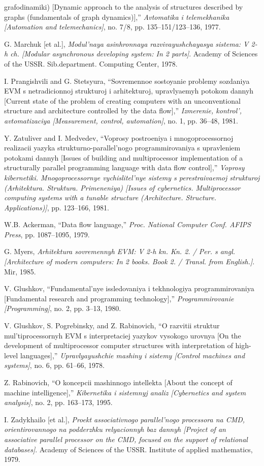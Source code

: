 \documentclass{article}
\begin{document}
{\begin{multicols}{2}
{\begin{enumerate}[label={[\arabic*]}]
grafodinamiki) [Dynamic approach to the analysis of structures
described by graphs (fundamentals of graph dynamics)],” \textit{Avtomatika i telemekhanika [Automation and telemechanics]}, no.
7/8, pp. 135–151/123–136, 1977.
    \item  G. Marchuk [et al.], \textit{Modul’naya asinhronnaya
razvivayushchayasya sistema: V 2-h ch. [Modular asynchronous
developing system: In 2 parts]}. Academy of Sciences of the
USSR. Sib.department. Computing Center, 1978.
    \item
    I. Prangishvili and G. Stetsyura, “Sovremennoe sostoyanie problemy sozdaniya EVM s netradicionnoj strukturoj i arhitekturoj,
upravlyaemyh potokom dannyh [Current state of the problem
of creating computers with an unconventional structure and
architecture controlled by the data flow],” \textit{Izmerenie, kontrol’,
avtomatizaciya [Measurement, control, automation]}, no. 1, pp.
36–48, 1981.
    \item Y. Zatuliver and I. Medvedev, “Voprosy postroeniya i mnogoprocessornoj realizacii yazyka strukturno-parallel’nogo programmirovaniya s upravleniem potokami dannyh [Issues of
building and multiprocessor implementation of a structurally
parallel programming language with data flow control],” \textit{Voprosy kibernetiki. Mnogoprocessornye vychislitel’nye sistemy s
perestraivaemoj strukturoj (Arhitektura. Struktura. Primeneniya)
[Issues of cybernetics. Multiprocessor computing systems with
a tunable structure (Architecture. Structure. Applications)]}, pp.
123–166, 1981.
    \item
    W.B. Ackerman, “Data flow language,” \textit{Proc. National Computer
Conf. AFIPS Press}, pp. 1087–1095, 1979.
    \item G. Myers, \textit{Arhitektura sovremennyh EVM: V 2-h kn. Kn. 2. / Per.
s angl. [Architecture of modern computers: In 2 books. Book 2. /
Transl. from English.]}. Mir, 1985.
    \item V. Glushkov, “Fundamental’nye issledovaniya i tekhnologiya
programmirovaniya [Fundamental research and programming
technology],” \textit{Programmirovanie [Programming]}, no. 2, pp. 3–13,
1980.
    \item V. Glushkov, S. Pogrebinsky, and Z. Rabinovich, “O razvitii struktur mul’tiprocessornyh EVM s interpretaciej yazykov
vysokogo urovnya [On the development of multiprocessor computer structures with interpretation of high-level languages],”
\textit{Upravlyayushchie mashiny i sistemy [Control machines and
systems]}, no. 6, pp. 61–66, 1978.
    \item Z. Rabinovich, “O koncepcii mashinnogo intellekta [About the
concept of machine intelligence],” \textit{Kibernetika i sistemnyj analiz
[Cybernetics and system analysis]}, no. 2, pp. 163–173, 1995.
    \item I. Zadykhailo [et al.], \textit{Proekt associativnogo parallel’nogo processora na CMD, orientirovannogo na podderzhku relyacionnyh baz
dannyh [Project of an associative parallel processor on the CMD,
focused on the support of relational databases]}. Academy of
Sciences of the USSR. Institute of applied mathematics, 1979.


\end{enumerate}}
\end{multicols}}
\end{document}
